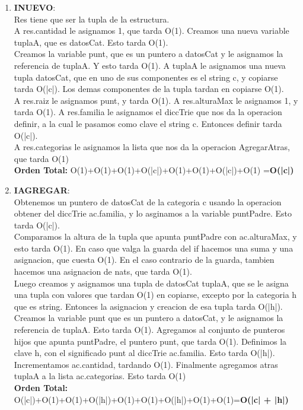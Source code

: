 \documentclass[10pt, a4paper]{article}
\begin{document}
\begin{enumerate}
     \item \textbf{INUEVO}:\\ Res tiene que ser la tupla de la estructura.\\ A res.cantidad le asignamos 1, que tarda O(1). Creamos una nueva variable tuplaA, que es datosCat. Esto tarda O(1). \\ Creamos la variable punt, que es un puntero a datosCat y le asignamos la referencia de tuplaA. Y esto tarda O(1). A tuplaA le asignamos una nueva tupla datosCat, que en uno de sus componentes es el string c, y copiarse tarda O(|c|). Los demas componentes de la tupla tardan en copiarse O(1). \\ A res.raiz le asignamos punt, y tarda O(1). A res.alturaMax le asignamos 1, y tarda O(1). A res.familia le asignamos el diccTrie que nos da la operacion definir, a la cual le pasamos como clave el string c. Entonces definir tarda O(|c|). \\ A res.categorias le asignamos la lista que nos da la operacion AgregarAtras, que tarda O(1)\\
	\textbf{Orden Total:} O(1)+O(1)+O(1)+O(|c|)+O(1)+O(1)+O(|c|)+O(1) =\textbf{O(|c|)}

     \item \textbf{IAGREGAR}:\\ Obtenemos un puntero de datosCat de la categoria c usando la operacion obtener del diccTrie ac.familia, y lo asginamos a la variable puntPadre. Esto tarda O(|c|).\\ Comparamos la altura de la tupla que apunta puntPadre con ac.alturaMax, y esto tarda O(1). En caso que valga la guarda del if hacemos una suma y una asignacion, que cuesta O(1). En el caso contrario de la guarda, tambien hacemos una asignacion de nats, que tarda O(1).\\ Luego creamos y asignamos una tupla de datosCat tuplaA, que se le asigna una tupla con valores que tardan O(1) en copiarse, excepto por la categoria h que es string. Entonces la asignacion y creacion de esa tupla tarda O(|h|).\\ Creamos la variable punt que es un puntero a datosCat, y le asignamos la referencia de tuplaA. Esto tarda O(1). Agregamos al conjunto de punteros hijos que apunta puntPadre, el puntero punt, que tarda O(1). Definimos la clave h, con el significado punt al diccTrie ac.familia. Esto tarda O(|h|).\\ Incrementamos ac.cantidad, tardando O(1). Finalmente agregamos atras tuplaA a la lista ac.categorias. Esto tarda O(1)\\
	\textbf{Orden Total:} O(|c|)+O(1)+O(1)+O(|h|)+O(1)+O(1)+O(|h|)+O(1)+O(1)=\textbf{O(|c| + |h|)}


\end{enumerate}
\end{document}
